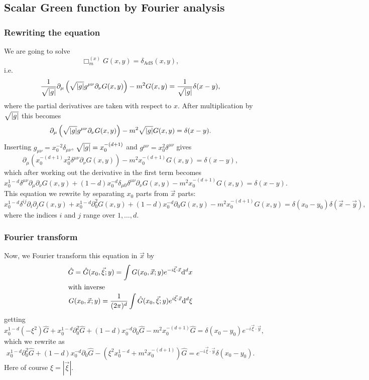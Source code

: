 \subsection{Scalar Green function by Fourier analysis}

\subsubsection{Rewriting the equation}
We are going to solve
$$\Box_m^{(x)}G(x,y)=\delta_{\mathrm{AdS}}(x,y),$$
i.e.
$$\frac{1}{\sqrt{|g|}}\partial_{\mu}\left(\sqrt{|g|} g^{\mu\nu}\partial_{\nu}G(x,y)\right)-m^2 G(x,y)=\frac{1}{\sqrt{|g|}}\delta(x-y),$$
where the partial derivatives are taken with respect to $x$.
After multiplication by $\sqrt{|g|}$ this becomes
$$\partial_{\mu}\left(\sqrt{|g|} g^{\mu\nu}\partial_{\nu}G(x,y)\right)-m^2 \sqrt{|g|} G(x,y) = \delta(x-y).$$
Inserting $g_{\mu\nu}=x_0^{-2}\delta_{\mu\nu}$, $\sqrt{|g|}=x_0^{-(d+1)}$ and $g^{\mu\nu}=x_0^2\delta^{\mu\nu}$ gives
$$\partial_{\mu}\left(x_0^{-(d+1)}x_0^2\delta^{\mu\nu}\partial_{\nu}G(x,y)\right)-m^2 x_0^{-(d+1)}G(x,y)=\delta(x-y),$$
which after working out the derivative in the first term becomes
$$x_0^{1-d}\delta^{\mu\nu}\partial_{\mu}\partial_{\nu}G(x,y)+(1-d)x_0^{-d}\delta_{\mu 0}\delta^{\mu\nu}\partial_{\nu}G(x,y)-m^2 x_0^{-(d+1)}G(x,y)=\delta(x-y).$$
This equation we rewrite by separating $x_0$ parts from $\vec x$ parts:
$$x_0^{1-d}\delta^{ij}\partial_i\partial_j G(x,y)+x_0^{1-d}\partial_0^2 G(x,y)+(1-d)x_0^{-d}\partial_0 G(x,y)-m^2 x_0^{-(d+1)}G(x,y)=\delta(x_0-y_0)\delta(\vec x-\vec y),$$
where the indices $i$ and $j$ range over $1,\dots,d$.

\subsubsection{Fourier transform}
Now, we Fourier transform this equation in $\vec{x}$ by
\begin{align}
\hat{G}=\hat{G}(x_0,\vec{\xi};y)=\int G(x_0,\vec{x};y) e^{-i\vec{\xi}\cdot\vec{x}} \mathrm{d}^d x \label{eq:fourier}\\
\intertext{with inverse}
G(x_0,\vec{x};y)=\frac{1}{(2\pi)^d}\int \hat{G}(x_0,\vec{\xi};y) e^{i\vec{\xi}\cdot\vec{x}} \mathrm{d}^d \xi \label{eq:ifourier}
\end{align}
getting
$$x_0^{1-d}(-\xi^2)\hat{G}+x_0^{1-d}\partial_0^2 \hat{G}+(1-d)x_0^{-d}\partial_0 \hat{G}-m^2 x_0^{-(d+1)} \hat{G} = \delta(x_0-y_0) e^{-i\vec{\xi}\cdot\vec{y}},$$
which we rewrite as
\begin{equation}\label{eq:ghatode}
x_0^{1-d}\partial_0^2 \hat{G} + (1-d)x_0^{-d}\partial_0\hat{G}-(\xi^2 x_0^{1-d} + m^2 x_0^{-(d+1)})\hat{G}=e^{-i\vec{\xi}\cdot\vec{y}}\delta(x_0-y_0).
\end{equation}
Here of course $\xi=|\vec{\xi}|$.

